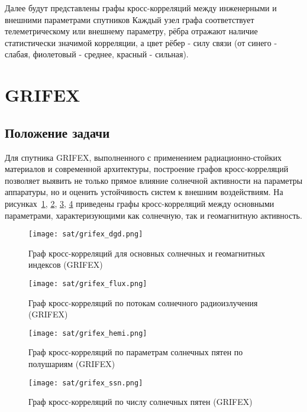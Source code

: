Далее будут представлены графы кросс-корреляций между инженерными и внешними параметрами спутников Каждый узел графа соответствует телеметрическому или внешнему параметру, рёбра отражают наличие статистически значимой корреляции, а цвет рёбер - силу связи (от синего - слабая, фиолетовый - среднее, красный - сильная).

\section{GRIFEX}

\subsection{Положение задачи}

Для спутника GRIFEX, выполненного с применением радиационно-стойких материалов и
современной архитектуры, построение графов кросс-корреляций позволяет выявить не
только прямое влияние солнечной активности на параметры аппаратуры, но и оценить
устойчивость систем к внешним воздействиям. На рисунках~\ref{fig:grifex_dgd},
\ref{fig:grifex_flux}, \ref{fig:grifex_hemi}, \ref{fig:grifex_ssn} приведены
графы кросс-корреляций между основными параметрами, характеризующими как
солнечную, так и геомагнитную активность.

\begin{figure}[H]
	\centering
	\texttt{[image: sat/grifex\_dgd.png]}
	\caption{Граф кросс-корреляций для основных солнечных и геомагнитных индексов (GRIFEX)}
	\label{fig:grifex_dgd}
\end{figure}

\begin{figure}[H]
	\centering
	\texttt{[image: sat/grifex\_flux.png]}
	\caption{Граф кросс-корреляций по потокам солнечного радиоизлучения (GRIFEX)}
	\label{fig:grifex_flux}
\end{figure}

\begin{figure}[H]
	\centering
	\texttt{[image: sat/grifex\_hemi.png]}
	\caption{Граф кросс-корреляций по параметрам солнечных пятен по полушариям (GRIFEX)}
	\label{fig:grifex_hemi}
\end{figure}

\begin{figure}[H]
	\centering
	\texttt{[image: sat/grifex\_ssn.png]}
	\caption{Граф кросс-корреляций по числу солнечных пятен (GRIFEX)}
	\label{fig:grifex_ssn}
\end{figure}

